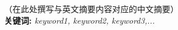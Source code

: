 
\chapter*{\huge {}}

（在此处撰写与英文摘要内容对应的中文摘要）\newline
\\
\textbf{关键词: } \textit{keyword1, keyword2, keyword3,...}

